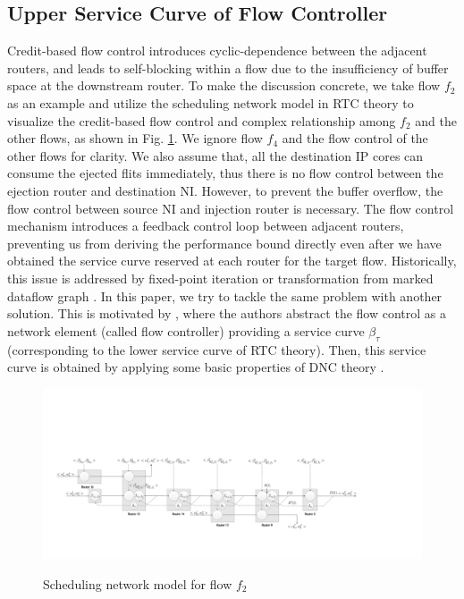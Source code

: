 \documentclass[10pt,journal]{IEEEtran}
\begin{document}
\subsection{Upper Service Curve of Flow Controller}\label{flowcontrol}
Credit-based flow control introduces cyclic-dependence between the adjacent routers, and leads to self-blocking within a flow due to the insufficiency of buffer space at the downstream router. To make the discussion concrete, we take flow $f_2$ as an example and utilize the scheduling network model \cite{1253607} in RTC theory to visualize the credit-based flow control and complex relationship among $f_2$ and the other flows, as shown in Fig. \ref{f2}. We ignore flow $f_4$ and the flow control of the other flows for clarity. We also assume that, all the destination IP cores can consume the ejected flits immediately, thus there is no flow control between the ejection router and destination NI. However, to prevent the buffer overflow, the flow control between source NI and injection router is necessary. The flow control mechanism introduces a feedback control loop between adjacent routers, preventing us from deriving the performance bound directly even after we have obtained the service curve reserved at each router for the target flow. Historically, this issue is addressed  by fixed-point iteration \cite{schioler2005network} or transformation from marked dataflow graph \cite{Thiele:2009:MPA:1629335.1629353}. In this paper, we try to tackle the same problem with another solution. This is motivated by \cite{qian2009analysis}, where the authors abstract the flow control as a network element (called flow controller) providing a service curve $\beta_{\tau}$ (corresponding to the lower service curve of RTC theory). Then, this service curve is obtained by applying some basic properties of DNC theory \cite{Boudec2001Network}.
\begin{figure}
  \centering
  \includegraphics[scale=0.35]{figures/f2.pdf}\\
  \caption{Scheduling network model for flow $f_2$}\label{f2}
\end{figure}
\end{document}
